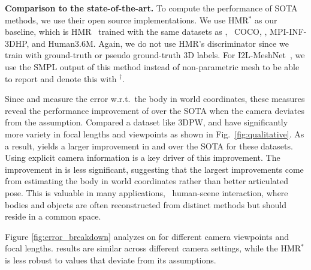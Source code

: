 \documentclass[10pt,twocolumn,letterpaper,usenames,dvipsnames]{article}
\begin{document}
{\bf Comparison to the state-of-the-art.} 
To compute the performance of SOTA methods, we use their open source implementations. 
We use HMR$^{*}$ as our \iwcam baseline, 
which is HMR~\cite{kanazawa_hmr} trained with the same datasets as \methodname, \ie~COCO, \agoracam, MPI-INF-3DHP, and Human3.6M. 
Again, we do not use HMR's discriminator since we train with ground-truth or pseudo ground-truth 3D labels. For I2L-MeshNet~\cite{Moon_2020_ECCV_I2L-MeshNet}, we use the SMPL output of this method instead of non-parametric mesh to be able to report \wpve and denote this with $^{\dagger}$.

Since \wmpjpe and \wpve measure the error w.r.t.~the body in world coordinates, 
these measures reveal the performance improvement of \methodname over the SOTA when the camera deviates from the \iwcam assumption. 
Compared a dataset like 3DPW, \mtpcam and \agoracam have significantly more variety in focal lengths and viewpoints as shown in Fig.~\ref{fig:qualitative}.
As a result, \methodname yields a larger improvement in \wmpjpe and \wpve  over the SOTA for these datasets.
Using explicit camera information is a key driver of this improvement. 
The improvement in \pampjpe is less significant, suggesting that the largest improvements come from estimating the body in world coordinates rather than better articulated pose.
This is valuable in many applications, \eg~human-scene interaction, where bodies and objects are often reconstructed from distinct methods but should reside in a common space.

Figure \ref{fig:error_breakdown} analyzes \wmpjpe on \agoracam for different camera viewpoints and focal lengths. \methodname results are similar across different camera settings, while the HMR$^{*}$ is less robust to values that deviate from its assumptions.
\end{document}
